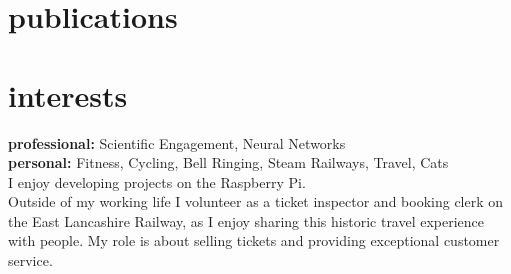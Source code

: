 \documentclass[]{cv-style}          %
\begin{document}
\section{publications}
\begin{entrylist}
\end{entrylist}

\section{interests}
  \vspace{-0.2cm}

\textbf{professional:} Scientific Engagement, Neural Networks\\

\textbf{personal:} Fitness, Cycling, Bell Ringing, Steam Railways, Travel, Cats\\
I enjoy developing projects on the Raspberry Pi.\\
Outside of my working life I volunteer as a ticket inspector and booking clerk on the East Lancashire Railway, as I enjoy sharing this historic travel experience with people. My role is about selling tickets and providing exceptional customer service.

\end{document}
